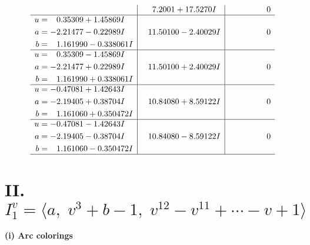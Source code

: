 \documentclass[1p]{elsarticle_modified}
\theoremstyle{definition}
\begin{document}
$$\begin{array}{c|c|c}
 & \phantom{-}7.2001 + 17.5270 I & \phantom{-0.000000 } 0 \\ \hline\begin{aligned}
u &= \phantom{-}0.35309 + 1.45869 I \\
a &= -2.21477 - 0.22989 I \\
b &= \phantom{-}1.161990 - 0.338061 I\end{aligned}
 & \phantom{-}11.50100 - 2.40029 I & \phantom{-0.000000 } 0 \\ \hline\begin{aligned}
u &= \phantom{-}0.35309 - 1.45869 I \\
a &= -2.21477 + 0.22989 I \\
b &= \phantom{-}1.161990 + 0.338061 I\end{aligned}
 & \phantom{-}11.50100 + 2.40029 I & \phantom{-0.000000 } 0 \\ \hline\begin{aligned}
u &= -0.47081 + 1.42643 I \\
a &= -2.19405 + 0.38704 I \\
b &= \phantom{-}1.161060 + 0.350472 I\end{aligned}
 & \phantom{-}10.84080 + 8.59122 I & \phantom{-0.000000 } 0 \\ \hline\begin{aligned}
u &= -0.47081 - 1.42643 I \\
a &= -2.19405 - 0.38704 I \\
b &= \phantom{-}1.161060 - 0.350472 I\end{aligned}
 & \phantom{-}10.84080 - 8.59122 I & \phantom{-0.000000 } 0\\
 \hline 
 \end{array}$$\newpage\newpage\renewcommand{\arraystretch}{1}
\centering \section*{II. $I^v_{1}= \langle a,\;v^3+b-1,\;v^{12}- v^{11}+\cdots- v+1 \rangle$}
\flushleft \textbf{(i) Arc colorings}\\
\end{document}
